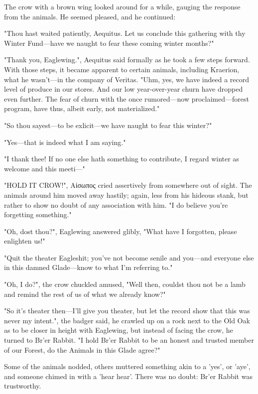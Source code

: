 

The crow with a brown wing looked around for a while, gauging the response from the animals. He seemed pleased, and he continued:

"Thou hast waited patiently, Aequitus. Let us conclude this gathering with thy Winter Fund---have we naught to fear these coming winter months?"

"Thank you, Eaglewing.", Aequitus said formally as he took a few steps forward. With those steps, it became apparent to certain animals, including Kraerion, what he wasn't---in the company of Veritas. "Uhm, yes, we have indeed a record level of produce in our stores. And our low year-over-year churn have dropped even further. The fear of churn with the once rumored---now proclaimed---forest program, have thus, albeit early, not materialized."

"So thou sayest---to be exlicit---we have naught to fear this winter?"

"Yes---that is indeed what I am saying."

"I thank thee! If no one else hath something to contribute, I regard winter as welcome and this meeti---"

"HOLD IT CROW!", Αίσωπος cried assertively from somewhere out of sight. The animals around him moved away hastily; again, less from his hideous stank, but rather to show no doubt of any association with him. "I do believe you're forgetting something."

"Oh, dost thou?", Eaglewing answered glibly, "What have I forgotten, please enlighten us!"

"Quit the theater Eagleshit; you've not become senile and you---and everyone else in this damned Glade---know to what I'm referring to."

"Oh, I do?", the crow chuckled amused, "Well then, couldst thou not be a lamb and remind the rest of us of what we already know?"

"So it's theater then---I'll give you theater, but let the record show that this was never my intent.", the badger said, he crawled up on a rock next to the Old Oak as to be closer in height with Eaglewing, but instead of facing the crow, he turned to Br'er Rabbit. "I hold Br'er Rabbit to be an honest and trusted member of our Forest, do the Animals in this Glade agree?"

Some of the animals nodded, others muttered something akin to a 'yes', or 'aye', and someone chimed in with a 'hear hear'. There was no doubt: Br'er Rabbit was trustworthy.

